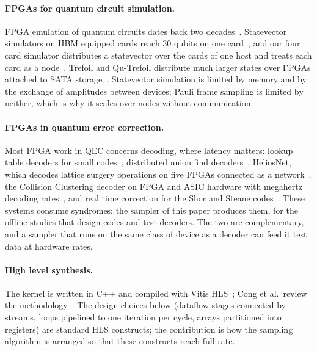 \paragraph{FPGAs for quantum circuit simulation.} FPGA emulation of quantum circuits dates back two
decades~\cite{khalid2004fpga}. Statevector simulators on HBM equipped cards reach 30 qubits on one
card~\cite{tiwari2026fpga30}, and our four card simulator distributes a statevector over the cards of one host and
treats each card as a node~\cite{ali2026multifpga}. Trefoil and Qu-Trefoil distribute much larger states over FPGAs
attached to SATA storage~\cite{niwase2023trefoil,wei2025qutrefoil}. Statevector simulation is limited by memory and by
the exchange of amplitudes between devices; Pauli frame sampling is limited by neither, which is why it scales over
nodes without communication.

\paragraph{FPGAs in quantum error correction.} Most FPGA work in QEC concerns decoding, where latency matters:
lookup table decoders for small codes~\cite{das2022lilliput}, distributed union find decoders~\cite{
delfosse2021unionfind,liyanage2023fpga,liyanage2024distributed}, HeliosNet, which decodes lattice surgery operations
on five FPGAs connected as a network~\cite{liyanage2024multifpga}, the Collision Clustering decoder on FPGA and ASIC
hardware with megahertz decoding rates~\cite{barber2025decoder}, and real time correction for the Shor and Steane
codes~\cite{ali2026qec}. These systems consume syndromes; the sampler of this
paper produces them, for the offline studies that design codes and test decoders. The two are complementary, and a
sampler that runs on the same class of device as a decoder can feed it test data at hardware rates.

\paragraph{High level synthesis.} The kernel is written in C++ and compiled with Vitis HLS~\cite{amd_ug1399}; Cong et
al.\ review the methodology~\cite{cong2011hls}. The design choices below (dataflow stages connected by streams, loops
pipelined to one iteration per cycle, arrays partitioned into registers) are standard HLS constructs; the
contribution is how the sampling algorithm is arranged so that these constructs reach full rate.
